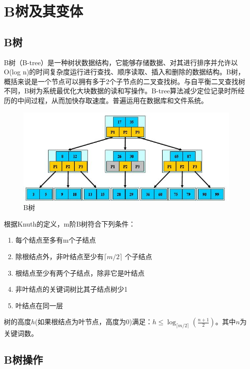 \section{B树及其变体}

\subsection{B树}
B树（B-tree）是一种树状数据结构，它能够存储数据、对其进行排序并允许以O(log n)的时间复杂度运行进行查找、顺序读取、插入和删除的数据结构。B树，概括来说是一个节点可以拥有多于2个子节点的二叉查找树。与自平衡二叉查找树不同，B树为系统最优化大块数据的读和写操作。B-tree算法减少定位记录时所经历的中间过程，从而加快存取速度。普遍运用在数据库和文件系统。

\begin{figure}[ht]
	\begin{center}
		\includegraphics[keepaspectratio,width=0.6\paperwidth]{Pictures/BTree/BTreeBlogPicture.jpg}
	\caption{B树}
	\label{fig:BTreeBlogPicture}
	\end{center}
\end{figure}


根据Knuth的定义，m阶B树符合下列条件：
\begin{enumerate}
  \item 每个结点至多有m个子结点
  \item 除根结点外，非叶结点至少有$\lceil m/2 \rceil$ 个子结点
  \item 根结点至少有两个子结点，除非它是叶结点
  \item 非叶结点的关键词树比其子结点树少1
  \item 叶结点在同一层
\end{enumerate}
树的高度$h$(如果根结点为叶节点，高度为0)满足：$h \le \log_{\lceil m/2 \rceil}(\frac{n+1}{2})$。其中$n$为关键词数。

\subsection{B树操作}

